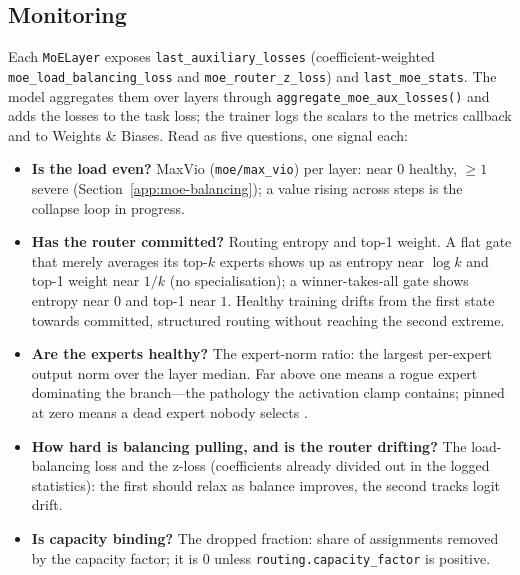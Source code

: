 \subsection{Monitoring}
\label{app:moe-monitoring}

Each \texttt{MoELayer} exposes \texttt{last\_auxiliary\_losses}
(coefficient-weighted \texttt{moe\_load\_balancing\_loss} and
\texttt{moe\_router\_z\_loss}) and \texttt{last\_moe\_stats}. The model
aggregates them over layers through
\texttt{aggregate\_moe\_aux\_losses()} and adds the losses to the task loss;
the trainer logs the scalars to the metrics callback and to Weights \&
Biases. Read as five questions, one signal each:
\begin{itemize}[leftmargin=1.4em]
  \item \textbf{Is the load even?} MaxVio (\texttt{moe/max\_vio}) per layer:
        near $0$ healthy, $\geqslant 1$ severe (Section~\ref{app:moe-balancing});
        a value rising across steps is the collapse loop in progress.
  \item \textbf{Has the router committed?} Routing entropy and top-1 weight.
        A flat gate that merely averages its top-$k$ experts shows up as
        entropy near $\log k$ and top-1 weight near $1/k$ (no
        specialisation); a winner-takes-all gate shows entropy near $0$ and
        top-1 near $1$. Healthy training drifts from the first state towards
        committed, structured routing without reaching the second extreme.
  \item \textbf{Are the experts healthy?} The expert-norm ratio: the largest
        per-expert output norm over the layer median. Far above one means a
        rogue expert dominating the branch---the pathology the activation
        clamp contains; pinned at zero means a dead expert nobody selects
        \citep{huang2026step35}.
  \item \textbf{How hard is balancing pulling, and is the router drifting?}
        The load-balancing loss and the z-loss (coefficients already divided
        out in the logged statistics): the first should relax as balance
        improves, the second tracks logit drift.
  \item \textbf{Is capacity binding?} The dropped fraction: share of
        assignments removed by the capacity factor; it is $0$ unless
        \texttt{routing.capacity\_factor} is positive.
\end{itemize}

